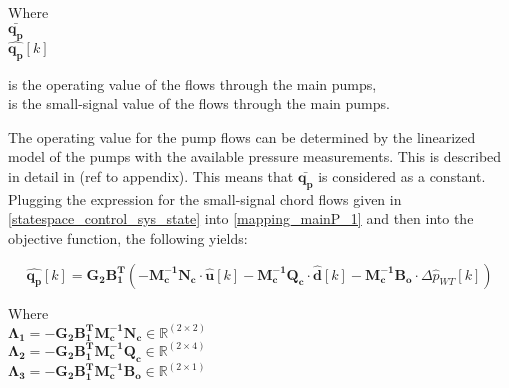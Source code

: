 \begin{minipage}[t]{0.20\textwidth}
Where\\
\hspace*{8mm} $ \bm{\bar{q_p}} $ \\
\hspace*{8mm} $ \bm{\hat{q_p}}[k] $ 
\end{minipage}
\begin{minipage}[t]{0.68\textwidth}
\vspace*{2mm}
is the operating value of the flows through the main pumps, \\
is the small-signal value of the flows through the main pumps. 
\end{minipage} 

The operating value for the pump flows can be determined by the linearized model of the pumps with the available pressure measurements. This is described in detail in (ref to appendix). This means that $\bm{\bar{q_p}}$ is considered as a constant. 
\\
Plugging the expression for the small-signal chord flows given in \eqref{statespace_control_sys_state} into \eqref{mapping_mainP_1} and then into the objective function, the following yields:


 \begin{equation}
 \bm{\hat{q_{p}}}[k] =   \bm{G_{2}} \bm{B_{1}^T}(-\bm{M_c^{-1}}\bm{N_c} \cdot \bm{\hat{u}}[k] -\bm{M_c^{-1}}\bm{Q_c} \cdot \bm{\hat{d}}[k] -\bm{M_c^{-1}}\bm{B_{o}} \cdot \Delta \hat{p}_{WT}[k])   
 \label{mappingandstates}
\end{equation}

\begin{minipage}[t]{0.80\textwidth}
Where\\
\hspace*{8mm} $\bm{\Lambda_1} = -\bm{G_{2}} \bm{B_{1}^T}\bm{M_c^{-1}}\bm{N_c} \in \pmb{\mathbb{R}}^{(2 \times 2)}$ \\
\hspace*{8mm} $\bm{\Lambda_2} = -\bm{G_{2}} \bm{B_{1}^T}\bm{M_c^{-1}}\bm{Q_c} \in \pmb{\mathbb{R}}^{(2 \times 4)}$ \\
\hspace*{8mm} $\bm{\Lambda_3} = -\bm{G_{2}} \bm{B_{1}^T}\bm{M_c^{-1}}\bm{B_{o}} \in \pmb{\mathbb{R}}^{(2 \times 1)}$ 
\end{minipage}

